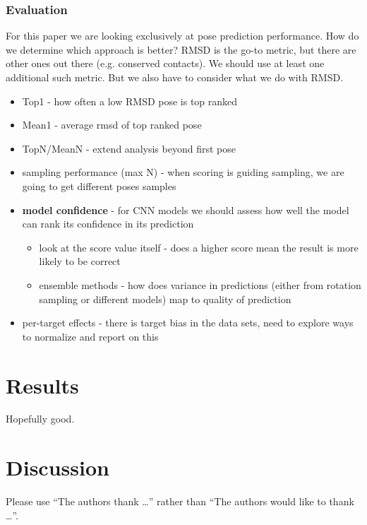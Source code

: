 \documentclass[journal=jcisd8,manuscript=article]{achemso}
\begin{document}
\subsubsection{Evaluation}
For this paper we are looking exclusively at pose prediction performance. How do we determine which approach is better?  RMSD is the go-to metric, but there are other ones out there (e.g. conserved contacts).  We should use at least one additional such metric.  But we also have to consider what we do with RMSD.  

\begin{itemize}
    \item Top1 - how often a low RMSD pose is top ranked
    \item Mean1 - average rmsd of top ranked pose
    \item TopN/MeanN - extend analysis beyond first pose
    \item sampling performance (max N) - when scoring is guiding sampling, we are going to get different poses samples
    \item \textbf{model confidence} - for CNN models we should assess how well the model can rank its confidence in its prediction
    \begin{itemize}
        \item look at the score value itself - does a higher score mean the result is more likely to be correct
        \item ensemble methods - how does variance in predictions (either from rotation sampling or different models) map to quality of prediction
    \end{itemize}
    \item per-target effects - there is target bias in the data sets, need to explore ways to normalize and report on this
\end{itemize}


\section{Results}
Hopefully good.

\section{Discussion}



\begin{acknowledgement}

Please use ``The authors thank \ldots'' rather than ``The
authors would like to thank \ldots''.



\end{acknowledgement}
\end{document}
